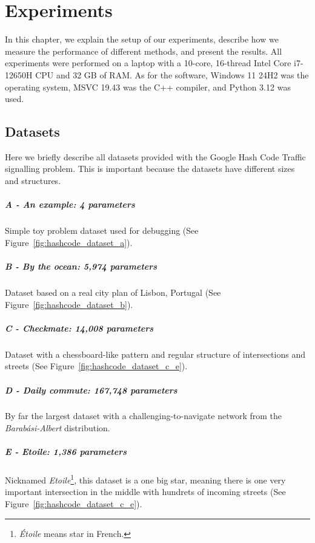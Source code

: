 \chapter{Experiments}

In this chapter, we explain the setup of our experiments, describe how we measure the performance of different methods, and present the results.
All experiments were performed on a laptop with a 10-core, 16-thread Intel Core i7-12650H CPU and 32 GB of RAM. As for the software, Windows 11 24H2 was the operating system, MSVC 19.43 was the C++ compiler, and Python 3.12 was used.

\section{Datasets}

Here we briefly describe all datasets provided with the Google Hash Code Traffic signalling problem. This is important because the datasets have different sizes and structures.

\paragraph{A - An example: 4 parameters} Simple toy problem dataset used for debugging (See Figure~\ref{fig:hashcode_dataset_a}).

\paragraph{B - By the ocean: 5,974 parameters} Dataset based on a real city plan of Lisbon, Portugal (See Figure~\ref{fig:hashcode_dataset_b}).

\paragraph{C - Checkmate: 14,008 parameters} Dataset with a chessboard-like pattern and regular structure of intersections and streets (See Figure~\ref{fig:hashcode_dataset_c_e}).

\paragraph{D - Daily commute: 167,748 parameters} By far the largest dataset with a challenging-to-navigate network from the \textit{Barabási-Albert} distribution.

\paragraph{E - Etoile: 1,386 parameters} Nicknamed \textit{Etoile}\footnote{\textit{Étoile} means star in French.}, this dataset is a one big star, meaning there is one very important intersection in the middle with hundrets of incoming streets (See Figure~\ref{fig:hashcode_dataset_c_e}).

